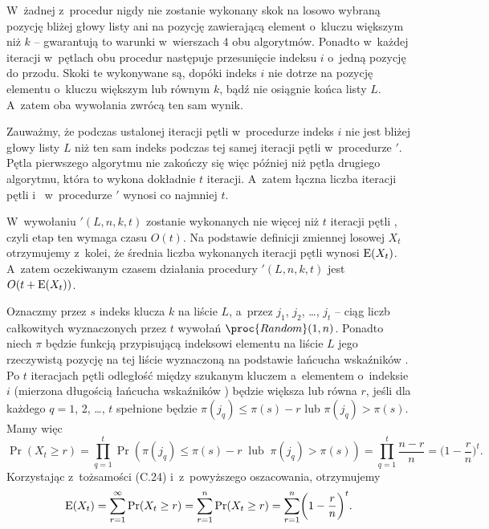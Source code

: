 
\subproblem %
W~żadnej z~procedur nigdy nie zostanie wykonany skok na losowo wybraną pozycję bliżej głowy listy ani na pozycję zawierającą element o~kluczu większym niż $k$ -- gwarantują to warunki w~wierszach 4 obu algorytmów.
Ponadto w~każdej iteracji w~pętlach  obu procedur następuje przesunięcie indeksu $i$ o~jedną pozycję do przodu.
Skoki te wykonywane są, dopóki indeks $i$ nie dotrze na pozycję elementu o~kluczu większym lub równym $k$, bądź nie osiągnie końca listy $L$.
A~zatem oba wywołania zwrócą ten sam wynik.

Zauważmy, że podczas ustalonej iteracji pętli  w~procedurze  indeks $i$ nie jest bliżej głowy listy $L$ niż ten sam indeks podczas tej samej iteracji pętli  w~procedurze $'$.
Pętla pierwszego algorytmu nie zakończy się więc później niż pętla drugiego algorytmu, która to wykona dokładnie $t$ iteracji.
A~zatem łączna liczba iteracji pętli  i~ w~procedurze $'$ wynosi co najmniej $t$.

\subproblem %
W~wywołaniu $'(L,n,k,t)$ zostanie wykonanych nie więcej niż $t$ iteracji pętli , czyli etap ten wymaga czasu $O(t)$.
Na podstawie definicji zmiennej losowej $X_t$ otrzymujemy z~kolei, że średnia liczba wykonanych iteracji pętli  wynosi $\operatorname{E}(X_t)$.
A~zatem oczekiwanym czasem działania procedury $'(L,n,k,t)$ jest $O(t+\operatorname{E}(X_t))$.

\subproblem %
Oznaczmy przez $s$ indeks klucza $k$ na liście $L$, a~przez $j_1$, $j_2$, \dots, $j_t$ -- ciąg liczb całkowitych wyznaczonych przez $t$ wywołań $\proc{Random}(1,n)$.
Ponadto niech $\pi$ będzie funkcją przypisującą indeksowi elementu na liście $L$ jego rzeczywistą pozycję na tej liście wyznaczoną na podstawie łańcucha wskaźników .
Po $t$ iteracjach pętli  odległość między szukanym kluczem a~elementem o~indeksie $i$ (mierzona długością łańcucha wskaźników ) będzie większa lub równa $r$, jeśli dla każdego $q=1$, 2, \dots, $t$ spełnione będzie $\pi(j_q)\le\pi(s)-r$ lub $\pi(j_q)>\pi(s)$.
Mamy więc
\[
	\Pr(X_t\ge r) = \prod_{q=1}^t\Pr(\pi(j_q)\le\pi(s)-r\;\;\text{lub}\;\;\pi(j_q)>\pi(s)) = \prod_{q=1}^t\frac{n-r}{n} = \biggl(1-\frac{r}{n}\biggr)^t.
\]
Korzystając z~tożsamości (C.24) i~z~powyższego oszacowania, otrzymujemy
\[
	\operatorname{E}(X_t) = \sum_{r=1}^\infty\Pr(X_t\ge r) = \sum_{r=1}^n\Pr(X_t\ge r) = \sum_{r=1}^n\biggl(1-\frac{r}{n}\biggr)^t.
\]

